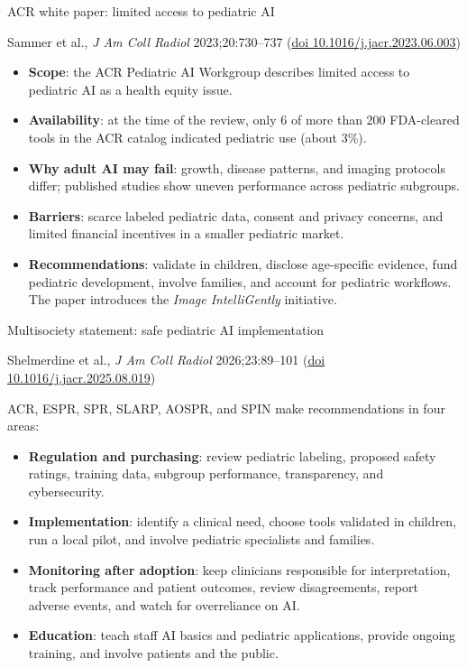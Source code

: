 \documentclass[aspectratio=169]{beamer}
\begin{document}
\begin{frame}[category=Reviews]{ACR white paper: limited access to pediatric AI}
\relax
{\scriptsize Sammer et al., \textit{J Am Coll Radiol} 2023;20:730--737
(\href{https://doi.org/10.1016/j.jacr.2023.06.003}{doi 10.1016/j.jacr.2023.06.003})\par}
\medskip
\small
\begin{itemize}
  \item \textbf{Scope}: the ACR Pediatric AI Workgroup describes limited access to pediatric AI as a health equity issue.
  \item \textbf{Availability}: at the time of the review, only 6 of more than 200 FDA-cleared tools in the ACR catalog indicated pediatric use (about 3\%).
  \item \textbf{Why adult AI may fail}: growth, disease patterns, and imaging protocols differ; published studies show uneven performance across pediatric subgroups.
  \item \textbf{Barriers}: scarce labeled pediatric data, consent and privacy concerns, and limited financial incentives in a smaller pediatric market.
  \item \textbf{Recommendations}: validate in children, disclose age-specific evidence, fund pediatric development, involve families, and account for pediatric workflows. The paper introduces the \textit{Image IntelliGently} initiative.
\end{itemize}
\end{frame}

\begin{frame}[category=Reviews]{Multisociety statement: safe pediatric AI implementation}
\relax
{\scriptsize Shelmerdine et al., \textit{J Am Coll Radiol} 2026;23:89--101
(\href{https://doi.org/10.1016/j.jacr.2025.08.019}{doi 10.1016/j.jacr.2025.08.019})\par}
\medskip
{\small ACR, ESPR, SPR, SLARP, AOSPR, and SPIN make recommendations in four areas:\par}
\small
\begin{itemize}
  \item \textbf{Regulation and purchasing}: review pediatric labeling, proposed safety ratings, training data, subgroup performance, transparency, and cybersecurity.
  \item \textbf{Implementation}: identify a clinical need, choose tools validated in children, run a local pilot, and involve pediatric specialists and families.
  \item \textbf{Monitoring after adoption}: keep clinicians responsible for interpretation, track performance and patient outcomes, review disagreements, report adverse events, and watch for overreliance on AI.
  \item \textbf{Education}: teach staff AI basics and pediatric applications, provide ongoing training, and involve patients and the public.
\end{itemize}
\end{frame}
\end{document}
